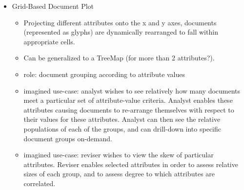 \documentclass[11pt,letterpaper]{article}
\begin{document}
\begin{itemize}
\item Grid-Based Document Plot
\begin{itemize}
\item Projecting different attributes onto the x and y axes, documents (represented as glyphs) are dynamically rearranged to fall within appropriate cells.
\item Can be generalized to a TreeMap (for more than 2 attributes?).
\item role: document grouping according to attribute values
\item imagined use-case: analyst wishes to see relatively how many documents meet a particular set of attribute-value criteria. Analyst enables these attributes causing documents to re-arrange themselves with respect to their values for these attributes. Analyst can then see the relative populations of each of the groups, and can drill-down into specific document groups on-demand.
\item imagined use-case: reviser wishes to view the skew of particular attributes. Reviser enables selected attributes in order to assess relative sizes of each group, and to assess degree to which attributes are correlated. 
\end{itemize}



\end{itemize}





\end{document}
